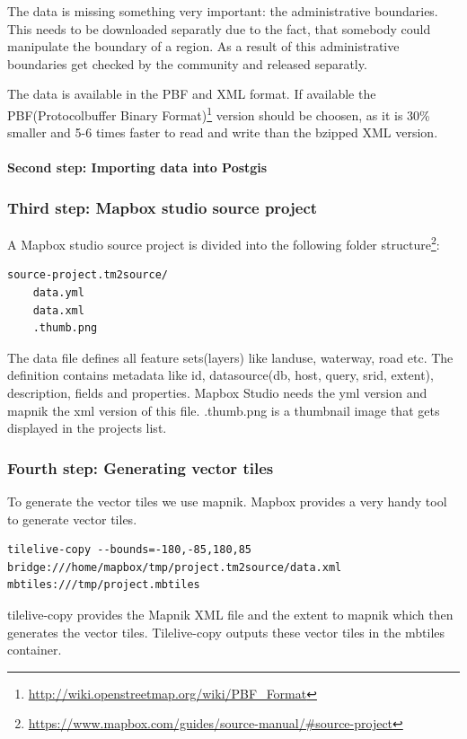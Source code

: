 The \osm{} data is missing something very important: the administrative
boundaries. This needs to be downloaded separatly due to the fact, that
somebody could manipulate the boundary of a region. As a result of this
administrative boundaries get checked by the \osm{} community and released
separatly.

The data is available in the PBF and \osm{} XML format. If available the
PBF(Protocolbuffer Binary
Format)\footnote{\url{http://wiki.openstreetmap.org/wiki/PBF_Format}}
version should be choosen, as it is 30\% smaller and 5-6 times faster to
read and write than the bzipped \osm{} XML version.

\paragraph{Second step: Importing \osm{} data into
Postgis}\label{second-step-importing-osm-data-into-postgis}


\subsubsection{Third step: Mapbox studio source
project}\label{third-step-mapbox-studio-source-project}

A Mapbox studio source project is divided into the following folder
structure\footnote{\url{https://www.mapbox.com/guides/source-manual/\#source-project}}:

\begin{verbatim}
source-project.tm2source/
    data.yml
    data.xml
    .thumb.png
\end{verbatim}

The data file defines all feature sets(layers) like landuse, waterway,
road etc. The definition contains metadata like id, datasource(db, host,
query, srid, extent), description, fields and properties. Mapbox Studio
needs the yml version and mapnik the xml version of this file.
.thumb.png is a thumbnail image that gets displayed in the projects
list.

\subsubsection{Fourth step: Generating vector
tiles}\label{fourth-step-generating-vector-tiles}

To generate the vector tiles we use mapnik. Mapbox provides a very handy
tool to generate vector tiles.

\begin{verbatim}
tilelive-copy --bounds=-180,-85,180,85 bridge:///home/mapbox/tmp/project.tm2source/data.xml mbtiles:///tmp/project.mbtiles
\end{verbatim}

tilelive-copy provides the Mapnik XML file and the extent to mapnik
which then generates the vector tiles. Tilelive-copy outputs these
vector tiles in the mbtiles container.
